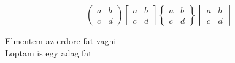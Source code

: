 \documentclass{article}
\begin{document}
   \[     
      \begin{pmatrix}
        a&b\\
    	c&d
    \end{pmatrix}
    \begin{bmatrix}
    	a&b\\
    	c&d
    \end{bmatrix}
	\begin{Bmatrix}
    	a&b\\
    	c&d    	
    \end{Bmatrix}    	
    \begin{vmatrix}
    	a&b\\
    	c&d    	
    \end{vmatrix}
  \]
  
Elmentem az erdore fat vagni\\
Loptam is egy adag fat\\
\end{document}
